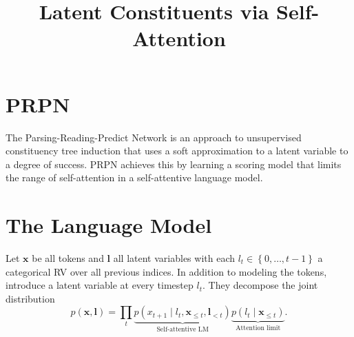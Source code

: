 \documentclass{article}
\title{Latent Constituents via Self-Attention}
\newcommand\set[1]{\left\{#1\right\}}
\newcommand{\bl}{\mathbf{l}}
\newcommand{\bx}{\mathbf{x}}
\newcommand{\bz}{\mathbf{z}}
\begin{document}
\maketitle

\begin{comment}
\section{Introduction}

\section{Problem}
We would like to learn a generative model
over source sentences $\bx = \{x_0, x_1, \ldots\}$,
using a distribution over latent trees $\bz$.  
We are primarily interested in the posterior distribution over trees given a sentence, $p(\bz\mid\bx)$.
The performance of the generative model is secondary since we would like to analyze the
output of the unsupervised model for any linguistic regularities, and use the model as a 
testbed for linguistic hypotheses (of which I have none at the moment).

\citep{shen2018prpn}
\citet{yin18structvae}
\end{comment}

\section{PRPN \citep{shen2018prpn}}
The Parsing-Reading-Predict Network \citep{shen2018prpn} is an approach to unsupervised constituency tree induction
that uses a soft approximation to a latent variable to a degree of success.
PRPN achieves this by learning a scoring model that limits the range of self-attention
in a self-attentive language model.

\section{The Language Model}
Let $\bx$ be all tokens
and $\bl$ all latent variables with each $l_t\in\set{0,\ldots,t-1}$ a categorical RV over all previous indices.
In addition to modeling the tokens,
\citet{shen2018prpn} introduce a latent variable at every timestep $l_t$. 
They decompose the joint distribution 
\begin{equation}
p(\bx, \bl)
= \prod_t \underbrace{p(x_{t+1}\mid l_t,\bx_{\le t},\bl_{<t})}_{\textrm{Self-attentive LM}}
\underbrace{p(l_t\mid\bx_{\le t})}_{\textrm{Attention limit}}.
\end{equation}
\end{document}
